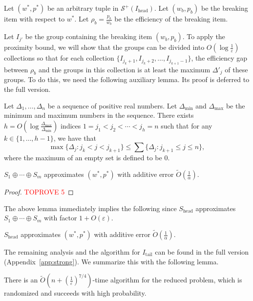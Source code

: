 \documentclass[a4paper,UKenglish,cleveref, autoref, thm-restate, pdfa]{lipics-v2021}
\newcommand{\eps}{\varepsilon}
\renewcommand{\leq}{\leqslant}
\begin{document}
Let $(w^*, p^*)$ be an arbitrary tuple in $\mathcal{S}^+(I_{\mathrm{head}})$. Let $(w_b, p_b)$ be the breaking item with respect to $w^*$. Let $\rho_b = \frac{p_b}{w_b}$ be the efficiency of the breaking item. 

Let $I_{j'}$ be the group containing the breaking item $(w_b, p_b)$. To apply the proximity bound, we will show that the groups can be divided into  $O(\log \frac{1}{\eps})$ collections so that for each collection $\{I_{j_{k} + 1}, I_{j_{k} + 2}, \ldots, I_{j_{k+1}-1} \}$, the efficiency gap between $\rho_b$ and the groups in this collection is at least the maximum $\Delta'_j$ of these groups. To do this,
we need the following auxiliary lemma. Its proof is deferred to the full version.

\begin{lemma}\label{lem:cluster-incomp}
    Let $\Delta_1, \ldots, \Delta_n$ be a sequence of positive real numbers. Let $\Delta_{\min}$ and $\Delta_{\max}$ be the minimum and maximum numbers in the sequence. There exists $h = O(\log \frac{\Delta_{\max}}{\Delta_{\min}})$ indices $1 = j_1 < j_2 < \cdots < j_h = n$ such that for any $k \in \{1, \ldots, h-1\}$, we have that
    \begin{equation}\label{eq:cluster-original-incomp}
            \max\{\Delta_j : j_k < j < j_{k+1}\} \leq \sum\{\Delta_j : j_{k+1} \leq j \leq n\},
    \end{equation}
    where the maximum of an empty set is defined to be $0$.
\end{lemma}


\begin{lemma}
    $S_1 \oplus \cdots \oplus S_m$ approximates $(w^*, p^*)$ with additive error $\tilde{O}(\frac{1}{\alpha})$.
\end{lemma}
\begin{proof}\textcolor{red}{TOPROVE 5}\end{proof}

The above lemma immediately implies the following since $S_{\mathrm{head}}$ approximates $ S_1 \oplus \cdots \oplus S_m$ with factor $1 + O(\eps)$.
\begin{corollary}
    $S_{\mathrm{head}}$ approximates $(w^*, p^*)$ with additive error $\tilde{O}(\frac{1}{\alpha})$.
\end{corollary}

The remaining analysis and the algorithm for $I_{\mathrm{tail}}$ can be found in the full version (Appendix~\ref{app:strong}). We summarize this with the following lemma.
\begin{lemma}
   There is an $\tilde{O}({n+(\frac{1}{\eps})^{7/4}})$-time algorithm for the reduced problem, which is randomized and succeeds with high probability.
\end{lemma}
\end{document}
